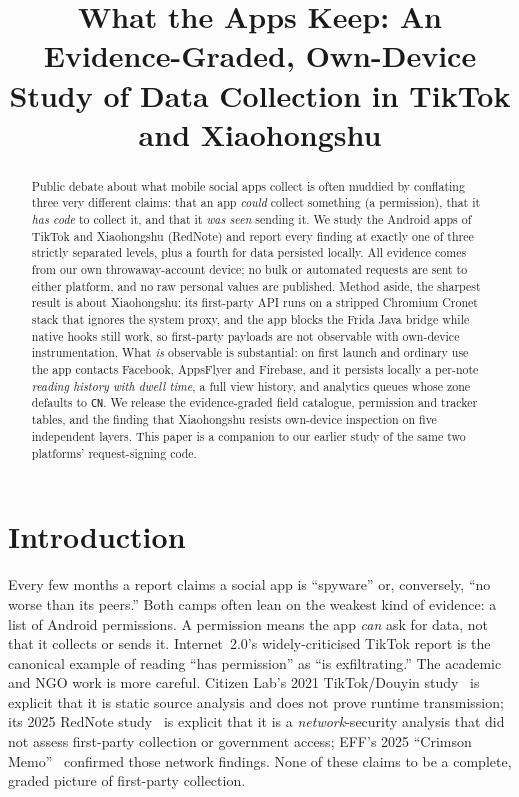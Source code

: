 \documentclass[conference,10pt]{IEEEtran}
\newcommand{\code}[1]{\texttt{\small #1}}
\begin{document}
\title{What the Apps Keep: An Evidence-Graded, Own-Device Study of Data Collection in TikTok and Xiaohongshu}

\author{
}

\maketitle

\begin{abstract}
Public debate about what mobile social apps collect is often muddied by conflating three very different claims: that an app \emph{could} collect something (a permission), that it \emph{has code} to collect it, and that it \emph{was seen} sending it. We study the Android apps of TikTok and Xiaohongshu (RedNote) and report every finding at exactly one of three strictly separated levels, plus a fourth for data persisted locally. All evidence comes from our own throwaway-account device; no bulk or automated requests are sent to either platform, and no raw personal values are published. Method aside, the sharpest result is about Xiaohongshu: its first-party API runs on a stripped Chromium Cronet stack that ignores the system proxy, and the app blocks the Frida Java bridge while native hooks still work, so first-party payloads are not observable with own-device instrumentation. What \emph{is} observable is substantial: on first launch and ordinary use the app contacts Facebook, AppsFlyer and Firebase, and it persists locally a per-note \emph{reading history with dwell time}, a full view history, and analytics queues whose zone defaults to \code{CN}. We release the evidence-graded field catalogue, permission and tracker tables, and the finding that Xiaohongshu resists own-device inspection on five independent layers. This paper is a companion to our earlier study of the same two platforms' request-signing code.
\end{abstract}

\section{Introduction}
Every few months a report claims a social app is ``spyware'' or, conversely, ``no worse than its peers.'' Both camps often lean on the weakest kind of evidence: a list of Android permissions. A permission means the app \emph{can} ask for data, not that it collects or sends it. Internet~2.0's widely-criticised TikTok report is the canonical example of reading ``has permission'' as ``is exfiltrating.'' The academic and NGO work is more careful. Citizen Lab's 2021 TikTok/Douyin study~\cite{citizenlab2021tiktok} is explicit that it is static source analysis and does not prove runtime transmission; its 2025 RedNote study~\cite{citizenlab2025rednote} is explicit that it is a \emph{network}-security analysis that did not assess first-party collection or government access; EFF's 2025 ``Crimson Memo''~\cite{eff2025crimson} confirmed those network findings. None of these claims to be a complete, graded picture of first-party collection.
\end{document}
